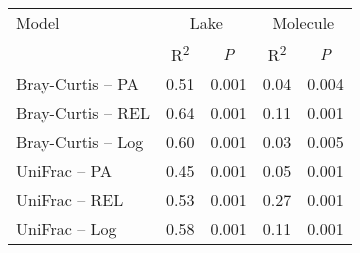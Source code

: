 \begin{table}[ht]
\centering
\begin{tabular}{l r r r r }
  \hline
\hline
  Model & \multicolumn{2}{c}{Lake} & \multicolumn{2}{c}{Molecule} \\
  & \multicolumn{1}{c}{R\textsuperscript{2}} & 
                          \multicolumn{1}{c}{\emph{P}} & 
                          \multicolumn{1}{c}{R\textsuperscript{2}} & 
                          \multicolumn{1}{c}{\emph{P}} \\
 \hline
Bray-Curtis -- PA & 0.51 & 0.001 & 0.04 & 0.004 \\ 
  Bray-Curtis -- REL & 0.64 & 0.001 & 0.11 & 0.001 \\ 
  Bray-Curtis -- Log & 0.60 & 0.001 & 0.03 & 0.005 \\ 
  UniFrac -- PA & 0.45 & 0.001 & 0.05 & 0.001 \\ 
  UniFrac -- REL & 0.53 & 0.001 & 0.27 & 0.001 \\ 
  UniFrac -- Log & 0.58 & 0.001 & 0.11 & 0.001 \\ 
   \hline
\end{tabular}
\end{table}
